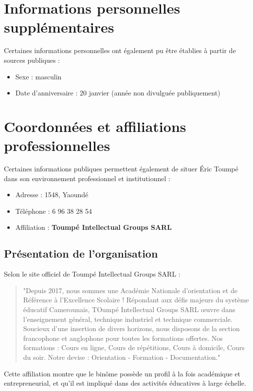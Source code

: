 \documentclass[memoire, 12pt]{report}
\begin{document}
\section{Informations personnelles supplémentaires}
Certaines informations personnelles ont également pu être établies à partir de sources publiques :

\begin{itemize}
    \item Sexe : masculin
    \item Date d'anniversaire : 20 janvier (année non divulguée publiquement)
\end{itemize}

\section{Coordonnées et affiliations professionnelles}
Certaines informations publiques permettent également de situer Éric Toumpé dans son environnement professionnel et institutionnel :

\begin{itemize}
    \item Adresse : 1548, Yaoundé
    \item Téléphone : 6 96 38 28 54
    \item Affiliation : \textbf{Toumpé Intellectual Groups SARL}
\end{itemize}

\subsection*{Présentation de l'organisation}
Selon le site officiel de Toumpé Intellectual Groups SARL :

\begin{quote}
"Depuis 2017, nous sommes une Académie Nationale d'orientation et de Référence à l'Excellence Scolaire ! Répondant aux défis majeurs du système éducatif Camerounais, TOumpé Intellectual Groups SARL œuvre dans l'enseignement général, technique industriel et technique commerciale. Soucieux d'une insertion de divers horizons, nous disposons de la section francophone et anglophone pour toutes les formations offertes. Nos formations : Cours en ligne, Cours de répétitions, Cours à domicile, Cours du soir. Notre devise : Orientation - Formation - Documentation."
\end{quote}

Cette affiliation montre que le binôme possède un profil à la fois académique et entrepreneurial, et qu’il est impliqué dans des activités éducatives à large échelle.
\end{document}
